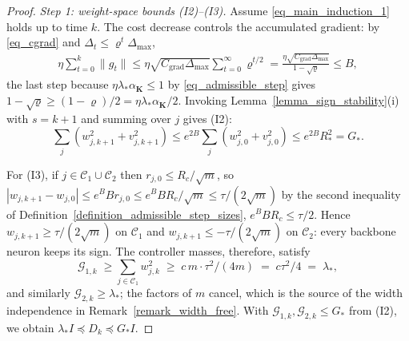 \documentclass[letterpaper, 10 pt, conference]{ieeeconf}
\newcommand{\bK}{\mathbf{K}}
\newcommand{\cC}{\mathcal{C}}
\newcommand{\cG}{\mathcal{G}}
\newcommand{\Lemm}{Lemma}
\newcommand{\Rem}{Remark}
\newcommand{\Defn}{Definition}
\begin{document}
\begin{proof}
    \emph{Step 1: weight-space bounds \textup{(I2)--(I3)}.} Assume \eqref{eq_main_induction_1} holds up to time $k$. The cost decrease controls the accumulated gradient: by \eqref{eq_cgrad} and $\Delta_{t} \le \varrho^{t}\Delta_{\max}$,
    \begin{equation} \label{eq_grad_budget}
        \begin{aligned}
        \eta \sum_{t=0}^{k} \|g_{t}\|
        {\le} \eta\sqrt{C_{\mathrm{grad}}\Delta_{\max}} \sum_{t=0}^{\infty}\varrho^{t/2}
        {=} \frac{\eta\sqrt{C_{\mathrm{grad}}\Delta_{\max}}}{1-\sqrt{\varrho}}
        {\le} B,
        \end{aligned}
    \end{equation}
    the last step because $\eta\lambda_{\ast}\alpha_{\bK} \le 1$ by \eqref{eq_admissible_step} gives $1-\sqrt{\varrho} \ge (1-\varrho)/2 = \eta\lambda_{\ast}\alpha_{\bK}/2$. Invoking \Lemm~\ref{lemma_sign_stability}(i) with $s = k+1$ and summing over $j$ gives (I2):
    \begin{equation}
        {\textstyle\sum_{j}} (w_{j,k+1}^{2} + v_{j,k+1}^{2})
        \le
        e^{2B} {\textstyle\sum_{j}} (w_{j,0}^{2} + v_{j,0}^{2})
        \le
        e^{2B} R_{\ast}^{2}
        =
        G_{\ast}.
    \end{equation}

    For (I3), if $j \in \cC_{1} \cup \cC_{2}$ then $r_{j,0} \le R_{c}/\sqrt{m}$, so
    $
        |w_{j,k+1} - w_{j,0}| \le e^{B} B r_{j,0} \le {e^{B} B R_{c}}/{\sqrt{m}} \le {\tau}/{(2\sqrt{m})}
    $
    by the second inequality of \Defn~\ref{definition_admissible_step_sizes}, $e^B B R_{c} \le \tau/2$. Hence $w_{j,k+1} \ge {\tau}/{(2\sqrt{m})}$ on $\cC_{1}$ and $w_{j,k+1} \le {-\tau}/{(2\sqrt{m})}$ on $\cC_{2}$: every backbone neuron keeps its sign. The controller masses, therefore, satisfy
    \begin{equation} \label{eq_mass_lower}
        \cG_{1,k}
        \;\ge \sum_{j \in \cC_{1}} w_{j,k}^{2}
        \;\ge\; c\,m \cdot {\tau^{2}}/{(4m)}
        \;=\; {c \tau^{2}}/{4}
        \;=\; \lambda_{\ast},
    \end{equation}
    and similarly $\cG_{2,k} \ge \lambda_{\ast}$; the factors of $m$ cancel, which is the source of the width independence in \Rem~\ref{remark_width_free}. With $\cG_{1,k},\cG_{2,k} \le G_{\ast}$ from (I2), we obtain $\lambda_{\ast} I \preceq D_{k} \preceq G_{\ast} I$.


\end{proof}
\end{document}
